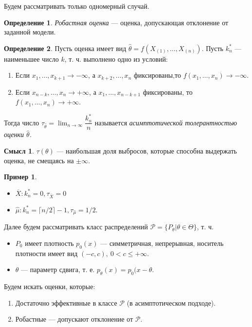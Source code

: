 \documentclass[12pt]{report}
\theoremstyle{definition}
\newtheorem{definition}{Определение}
\newtheorem{example}{Пример}
\newtheorem{sense}{Смысл}
\begin{document}
Будем рассматривать только одномерный случай.
\begin{definition}
	\emph{Робастная оценка} — оценка, допускающая отклонение от заданной модели.
\end{definition}
\begin{definition}
	Пусть оценка имеет вид $\widehat{\theta} = f(X_{(1)}, \dots, X_{(n)})$.  
	Пусть $k_n^*$ — наименьшее число $k$, т. ч. выполнено одно из условий:  
	\begin{enumerate}
		\item Если $x_1, \dots, x_{k+1} \to -\infty$, а $x_{k+2}, \dots, x_n$ фиксированы,то $f(x_1, \dots, x_n) \to -\infty$.
		\item Если $x_{n-k}, \dots, x_n \to +\infty$, а $x_1, \dots, x_{n-k+1}$ фиксированы, то $f(x_1, \dots, x_n) \to +\infty$.  
	\end{enumerate}
	Тогда число $\tau_{\widehat{\theta}} = \displaystyle\lim_{n\to\infty} \dfrac{k_n^*}{n}$ называется \emph{асимптотической толерантностью оценки $\widehat{\theta}$.}
\end{definition}
\begin{sense}
	$\tau(\theta)$ — наибольшая доля выбросов, которые способна выдержать оценка, не смещаясь на $\pm \infty$.  
\end{sense}
\begin{example}
	\begin{itemize}
		\item $\overline{X}: k_{n}^* = 0, \tau_{\overline{X}} = 0$
		\item $\widehat{\mu}: k_{n}^* = \lceil n/2 \rceil - 1, \tau_{\widehat{\mu}} = 1/2$.  
	\end{itemize}
\end{example}

Далее будем рассматривать класс распределений $\mathcal{P} = \{P_\theta \vert \theta \in \Theta\}$, т. ч.
\begin{itemize}
	\item $P_0$ имеет плотность $p_0(x)$ — симметричная, непрерывная, носитель плотности имеет вид $(-c, c),\ 0<c\leqslant +\infty$.
	\item $\theta$ — параметр сдвига, т. е. $p_\theta(x) = p_0(x-\theta $.
\end{itemize}
  
Будем искать оценки, которые:
\begin{enumerate}
	\item Достаточно эффективные в классе $\mathcal{P}$ (в асимптотическом подходе).
	\item Робастные — допускают отклонение от $\mathcal{P}$.	
\end{enumerate}
\end{document}
